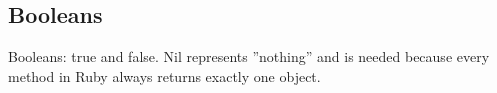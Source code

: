 \subsection{Booleans}
Booleans: true and false.
Nil represents ''nothing'' and is needed because every method in Ruby always returns exactly one object.